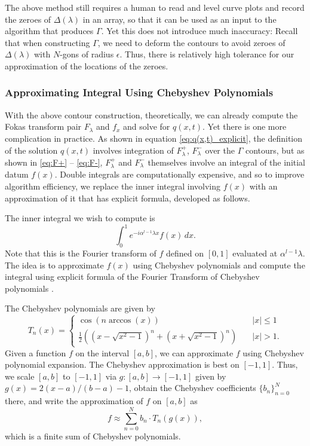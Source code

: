 \documentclass[11pt, oneside, a4paper]{article}
\begin{document}
The above method still requires a human to read and level curve plots and record the zeroes of $\Delta(\lambda)$ in an array, so that it can be used as an input to the algorithm that produces $\Gamma$. Yet this does not introduce much inaccuracy: Recall that when constructing $\Gamma$, we need to deform the contours to avoid zeroes of $\Delta(\lambda)$ with $N$-gons of radius $\epsilon$. Thus, there is relatively high tolerance for our approximation of the locations of the zeroes.

\subsubsection{Approximating Integral Using Chebyshev Polynomials}\label{sec:approximate_integral_chebyshev}

With the above contour construction, theoretically, we can already compute the Fokas transform pair $F_\lambda$ and $f_x$ and solve for $q(x,t)$. Yet there is one more complication in practice. As shown in equation \eqref{eq:q(x,t)_explicit}, the definition of the solution $q(x,t)$ involves integration of $F_\lambda^+$, $F_\lambda^-$ over the $\Gamma$ contours, but as shown in \eqref{eq:F+} -- \eqref{eq:F-}, $F_\lambda^+$ and $F_\lambda^-$ themselves involve an integral of the initial datum $f(x)$. Double integrals are computationally expensive, and so to improve algorithm efficiency, we replace the inner integral involving $f(x)$ with an approximation of it that has explicit formula, developed as follows.

The inner integral we wish to compute is
\[\int_0^1 e^{-i\alpha^{l-1}\lambda x}f(x)\,dx.\]
Note that this is the Fourier transform of $f$ defined on $[0,1]$ evaluated at $\alpha^{l-1}\lambda$.
The idea is to approximate $f(x)$ using Chebyshev polynomials and compute the integral using explicit formula of the Fourier Transform of Chebyshev polynomials \cite{Fokas2012}.

The Chebyshev polynomials are given by
\[
    T_n(x) =
\begin{cases}
    \cos(n \arccos(x))&\quad\mbox{$|x|\leq 1$}\\
    \frac{1}{2}\left((x-\sqrt{x^2-1})^n + (x+\sqrt{x^2-1})^n\right)&\quad\mbox{$|x|>1$}.
\end{cases}    
\]
Given a function $f$ on the interval $[a,b]$, we can approximate $f$ using Chebyshev polynomial expansion. The Chebyshev approximation is best on $[-1,1]$. Thus, we scale $[a,b]$ to $[-1,1]$ via $g:[a,b]\to [-1,1]$ given by $g(x)=2(x-a)/(b-a)-1$, obtain the Chebyshev coefficients $\{b_n\}_{n=0}^N$ there, and write the approximation of $f$ on $[a,b]$ as
\[f\approx \sum_{n=0}^N b_n\cdot T_n(g(x)),\]
which is a finite sum of Chebyshev polynomials.
\end{document}
